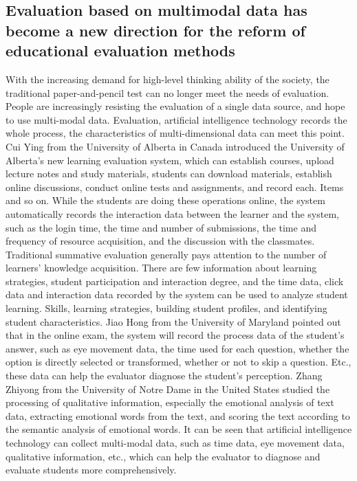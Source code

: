 \documentclass[lang=en,11pt,a4paper,towcolumn]{elegantpaper}
\begin{document}
{\subsection{Evaluation based on multimodal data has become a new direction for the reform of educational evaluation methods}
With the increasing demand for high-level thinking ability of the society, the traditional paper-and-pencil test can no longer meet the needs of evaluation. People are increasingly resisting the evaluation of a single data source, and hope to use multi-modal data. Evaluation, artificial intelligence technology records the whole process, the characteristics of multi-dimensional data can meet this point. Cui Ying from the University of Alberta in Canada introduced the University of Alberta's new learning evaluation system, which can establish courses, upload lecture notes and study materials, students can download materials, establish online discussions, conduct online tests and assignments, and record each. Items and so on. While the students are doing these operations online, the system automatically records the interaction data between the learner and the system, such as the login time, the time and number of submissions, the time and frequency of resource acquisition, and the discussion with the classmates. Traditional summative evaluation generally pays attention to the number of learners' knowledge acquisition. There are few information about learning strategies, student participation and interaction degree, and the time data, click data and interaction data recorded by the system can be used to analyze student learning. Skills, learning strategies, building student profiles, and identifying student characteristics. Jiao Hong from the University of Maryland pointed out that in the online exam, the system will record the process data of the student's answer, such as eye movement data, the time used for each question, whether the option is directly selected or transformed, whether or not to skip a question. Etc., these data can help the evaluator diagnose the student's perception. Zhang Zhiyong from the University of Notre Dame in the United States studied the processing of qualitative information, especially the emotional analysis of text data, extracting emotional words from the text, and scoring the text according to the semantic analysis of emotional words. It can be seen that artificial intelligence technology can collect multi-modal data, such as time data, eye movement data, qualitative information, etc., which can help the evaluator to diagnose and evaluate students more comprehensively.

}
\end{document}
